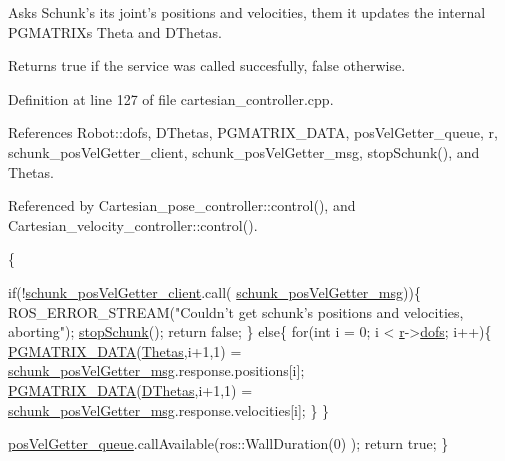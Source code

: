 Asks Schunk's its joint's positions and velocities, them it updates the internal P\-G\-M\-A\-T\-R\-I\-Xs Theta and D\-Thetas. 

\begin{DoxyReturn}{Returns}
true if the service was called succesfully, false otherwise. 
\end{DoxyReturn}


Definition at line 127 of file cartesian\-\_\-controller.\-cpp.



References Robot\-::dofs, D\-Thetas, P\-G\-M\-A\-T\-R\-I\-X\-\_\-\-D\-A\-T\-A, pos\-Vel\-Getter\-\_\-queue, r, schunk\-\_\-pos\-Vel\-Getter\-\_\-client, schunk\-\_\-pos\-Vel\-Getter\-\_\-msg, stop\-Schunk(), and Thetas.



Referenced by Cartesian\-\_\-pose\-\_\-controller\-::control(), and Cartesian\-\_\-velocity\-\_\-controller\-::control().


\begin{DoxyCode}
                                                                               
          \{

        \textcolor{keywordflow}{if}(!\hyperlink{classCartesian__controller_a5c1d9386bc5f219f2edc0d5d1b21f0da}{schunk\_posVelGetter\_client}.call(
      \hyperlink{classCartesian__controller_ae368dcf84dae528612c617cc92fbb69f}{schunk\_posVelGetter\_msg}))\{
                ROS\_ERROR\_STREAM(\textcolor{stringliteral}{"Couldn't get schunk's positions and
       velocities, aborting"});
                \hyperlink{classCartesian__controller_a3ba54e8b35632526c5e8eb2ab5d7de0d}{stopSchunk}();
                \textcolor{keywordflow}{return} \textcolor{keyword}{false};
        \}
        \textcolor{keywordflow}{else}\{
                \textcolor{keywordflow}{for}(\textcolor{keywordtype}{int} i = 0; i < \hyperlink{classCartesian__controller_a5562129951bd802e4ded77fc716c87a0}{r}->\hyperlink{structRobot_a51d4a86ac5314a1ed8614d5664c80747}{dofs}; i++)\{
                        \hyperlink{gmatrix_8h_a7333180c47234295df2bd7b09ac00da8}{PGMATRIX\_DATA}(\hyperlink{classCartesian__controller_a0a0f818dad601cd9e3e26cb6959b8eb6}{Thetas},i+1,1) = 
      \hyperlink{classCartesian__controller_ae368dcf84dae528612c617cc92fbb69f}{schunk\_posVelGetter\_msg}.response.positions[i];
                        \hyperlink{gmatrix_8h_a7333180c47234295df2bd7b09ac00da8}{PGMATRIX\_DATA}(\hyperlink{classCartesian__controller_a5d6419e62e130150edfcbd82b1dadcae}{DThetas},i+1,1) = 
      \hyperlink{classCartesian__controller_ae368dcf84dae528612c617cc92fbb69f}{schunk\_posVelGetter\_msg}.response.velocities[i];
                \}
        \}

        \hyperlink{classCartesian__controller_a144c7faad45f3d070624452c1f02ba15}{posVelGetter\_queue}.callAvailable(ros::WallDuration(0)
      );
        \textcolor{keywordflow}{return} \textcolor{keyword}{true};
\}
\end{DoxyCode}


